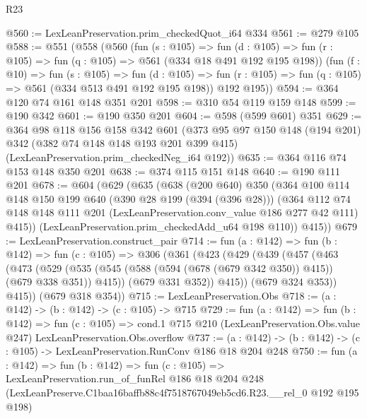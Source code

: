 \begin{lexlean}{R23}
\begin{coremodule}
@560 := LexLeanPreservation.prim_checkedQuot_i64 @334
@561 := @279 @105
@588 := @551
    (@558
      (@560
        (fun (s : @105) =>
        fun (d : @105) => fun (r : @105) => fun (q : @105) => @561 (@334 @18 @491 @192 @195 @198))
        (fun (f : @10) =>
        fun (s : @105) =>
        fun (d : @105) => fun (r : @105) => fun (q : @105) => @561 (@334 @513 @491 @192 @195 @198))
        @192
        @195))
@594 := @364 @120 @74 @161 @148 @351 @201
@598 := @310 @54 @119 @159 @148
@599 := @190 @342
@601 := @190 @350 @201
@604 := @598 (@599 @601) @351
@629 := @364
    @98
    @118
    @156
    @158
    @342
    @601
    (@373
      @95
      @97
      @150
      @148
      (@194 @201)
      @342
      (@382 @74 @148 @148 @193 @201 @399 @415)
      (LexLeanPreservation.prim_checkedNeg_i64 @192))
@635 := @364 @116 @74 @153 @148 @350 @201
@638 := @374 @115 @151 @148
@640 := @190 @111 @201
@678 := @604
    (@629
      (@635
        (@638
          (@200 @640)
          @350
          (@364
            @100
            @114
            @148
            @150
            @199
            @640
            (@390 @28 @199 (@394 (@396 @28)))
            (@364
              @112
              @74
              @148
              @148
              @111
              @201
              (LexLeanPreservation.conv_value @186 @277 @42 @111)
              @415))
          (LexLeanPreservation.prim_checkedAdd_u64 @198 @110))
        @415))
@679 := LexLeanPreservation.construct_pair
@714 := fun (a : @142) =>
  fun (b : @142) =>
  fun (c : @105) =>
  @306
    (@361
      (@423
        (@429
          (@439
            (@457
              (@463
                (@473
                  (@529
                    (@535 (@545 (@588 (@594 (@678 (@679 @342 @350)) @415)) (@679 @338 @351)) @415))
                  (@679 @331 @352))
                @415))
            (@679 @324 @353))
          @415))
      (@679 @318 @354))
@715 := LexLeanPreservation.Obs
@718 := (a : @142) -> (b : @142) -> (c : @105) -> @715
@729 := fun (a : @142) =>
  fun (b : @142) =>
  fun (c : @105) =>
  cond.{1} @715 @210 (LexLeanPreservation.Obs.value @247) LexLeanPreservation.Obs.overflow
@737 := (a : @142) -> (b : @142) -> (c : @105) -> LexLeanPreservation.RunConv @186 @18 @204 @248
@750 := fun (a : @142) =>
  fun (b : @142) =>
  fun (c : @105) =>
  LexLeanPreservation.run_of_funRel
    @186
    @18
    @204
    @248
    (LexLeanPreserve.C1baa16baffb88c4f7518767049eb5cd6.R23.__rel_0 @192 @195 @198)
\end{coremodule}
\end{lexlean}
